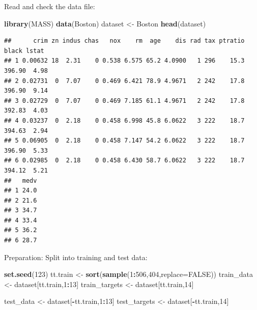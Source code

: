 \documentclass[
  10pt,
  ignorenonframetext,
]{beamer}
\newenvironment{Shaded}{\begin{snugshade}}{\end{snugshade}}
\newcommand{\AttributeTok}[1]{\textcolor[rgb]{0.13,0.29,0.53}{#1}}
\newcommand{\ConstantTok}[1]{\textcolor[rgb]{0.56,0.35,0.01}{#1}}
\newcommand{\DecValTok}[1]{\textcolor[rgb]{0.00,0.00,0.81}{#1}}
\newcommand{\FunctionTok}[1]{\textcolor[rgb]{0.13,0.29,0.53}{\textbf{#1}}}
\newcommand{\NormalTok}[1]{#1}
\newcommand{\OtherTok}[1]{\textcolor[rgb]{0.56,0.35,0.01}{#1}}
\newcommand{\SpecialCharTok}[1]{\textcolor[rgb]{0.81,0.36,0.00}{\textbf{#1}}}
\begin{document}
\begin{frame}[fragile]
Read and check the data file:

\scriptsize

\begin{Shaded}
\begin{Highlighting}[]
\FunctionTok{library}\NormalTok{(MASS)}
\FunctionTok{data}\NormalTok{(Boston)}
\NormalTok{dataset }\OtherTok{\textless{}{-}}\NormalTok{ Boston}
\FunctionTok{head}\NormalTok{(dataset)}
\end{Highlighting}
\end{Shaded}

\begin{verbatim}
##      crim zn indus chas   nox    rm  age    dis rad tax ptratio  black lstat
## 1 0.00632 18  2.31    0 0.538 6.575 65.2 4.0900   1 296    15.3 396.90  4.98
## 2 0.02731  0  7.07    0 0.469 6.421 78.9 4.9671   2 242    17.8 396.90  9.14
## 3 0.02729  0  7.07    0 0.469 7.185 61.1 4.9671   2 242    17.8 392.83  4.03
## 4 0.03237  0  2.18    0 0.458 6.998 45.8 6.0622   3 222    18.7 394.63  2.94
## 5 0.06905  0  2.18    0 0.458 7.147 54.2 6.0622   3 222    18.7 396.90  5.33
## 6 0.02985  0  2.18    0 0.458 6.430 58.7 6.0622   3 222    18.7 394.12  5.21
##   medv
## 1 24.0
## 2 21.6
## 3 34.7
## 4 33.4
## 5 36.2
## 6 28.7
\end{verbatim}

\normalsize

Preparation: Split into training and test data:

\scriptsize

\begin{Shaded}
\begin{Highlighting}[]
\FunctionTok{set.seed}\NormalTok{(}\DecValTok{123}\NormalTok{)}
\NormalTok{tt.train }\OtherTok{\textless{}{-}} \FunctionTok{sort}\NormalTok{(}\FunctionTok{sample}\NormalTok{(}\DecValTok{1}\SpecialCharTok{:}\DecValTok{506}\NormalTok{,}\DecValTok{404}\NormalTok{,}\AttributeTok{replace=}\ConstantTok{FALSE}\NormalTok{))}
\NormalTok{train\_data }\OtherTok{\textless{}{-}}\NormalTok{ dataset[tt.train,}\DecValTok{1}\SpecialCharTok{:}\DecValTok{13}\NormalTok{]}
\NormalTok{train\_targets }\OtherTok{\textless{}{-}}\NormalTok{ dataset[tt.train,}\DecValTok{14}\NormalTok{]}

\NormalTok{test\_data }\OtherTok{\textless{}{-}}\NormalTok{ dataset[}\SpecialCharTok{{-}}\NormalTok{tt.train,}\DecValTok{1}\SpecialCharTok{:}\DecValTok{13}\NormalTok{]}
\NormalTok{test\_targets }\OtherTok{\textless{}{-}}\NormalTok{ dataset[}\SpecialCharTok{{-}}\NormalTok{tt.train,}\DecValTok{14}\NormalTok{]}
\end{Highlighting}
\end{Shaded}
\end{frame}
\end{document}
